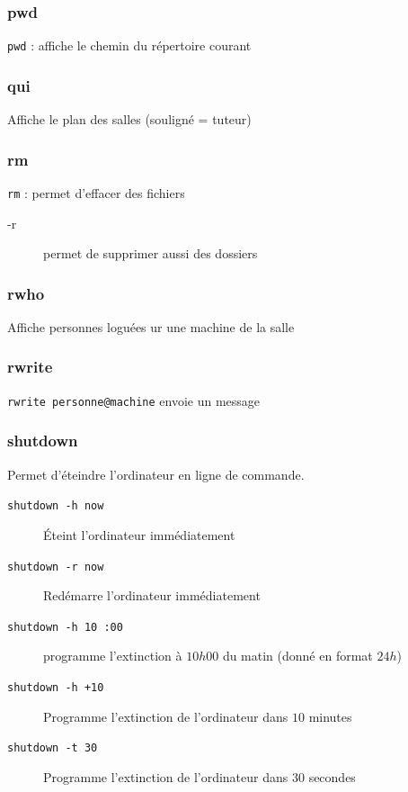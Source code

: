 \documentclass[a4paper,twoside]{article}
\begin{document}
\subsubsection{pwd}
\verb|pwd| : affiche le chemin du répertoire courant

\subsubsection{qui}
Affiche le plan des salles (souligné = tuteur)

\subsubsection{rm}
\verb|rm| : permet d'effacer des fichiers
\begin{description}
 \item[-r] permet de supprimer aussi des dossiers
\end{description}

\subsubsection{rwho}
Affiche personnes loguées ur une machine de la salle

\subsubsection{rwrite}
\verb|rwrite personne@machine| envoie un message

\subsubsection{shutdown}
Permet d'éteindre l'ordinateur en ligne de commande.
\begin{description}
\item[\texttt{shutdown -h now}] \'Eteint l'ordinateur immédiatement
\item[\texttt{shutdown -r now}] Redémarre l'ordinateur immédiatement
\item[\texttt{shutdown -h 10 :00}] programme l'extinction à $10h00$ du matin (donné en format $24h$)
\item[\texttt{shutdown -h +10}] Programme l'extinction de l'ordinateur dans $10$ minutes
\item[\texttt{shutdown -t 30}]Programme l'extinction de l'ordinateur dans $30$ secondes

\end{description}
\end{document}
